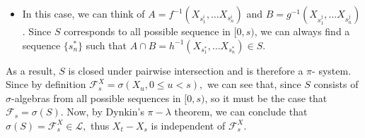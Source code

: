 \documentclass[11pt]{article}
\newcommand{\F}{{\mathcal F}}
\newcommand{\LL}{{\mathcal L}}
\begin{document}
\begin{enumerate}
\begin{itemize}
\item[] In this case, we can think of $A = f^{-1}(X_{s^{i}_1},\dots X_{s^{i}_{n}})$ and $B= g^{-1}(X_{s^{j}_1},\dots X_{s^{j}_{n}})$. Since $S$ corresponds to all possible sequence in $[0,s)$, we can always find a sequence $\{s^{*}_{n}\}$ such that $A \cap B = h^{-1} (X_{s^{*}_1},\dots X_{s^{*}_{n}}) \in S.$  
\end{itemize}
As a result, $S$ is closed under pairwise intersection and is therefore a $\pi$- system.  Since by definition $\F_s^{X} = \sigma(X_u, 0 \leq u < s),$ we can see that, since $S$ consists of $\sigma$-algebras from all possible sequences in $[0, s)$, so it must be the case that $\F_s = \sigma(S).$ Now, by Dynkin's $\pi-\lambda$ theorem, we can conclude that $\sigma(S) = \F^{X}_s \in \LL,$ thus $X_t-X_s$ is independent of $\F^{X}_s.$

\end{enumerate}
\end{document}
